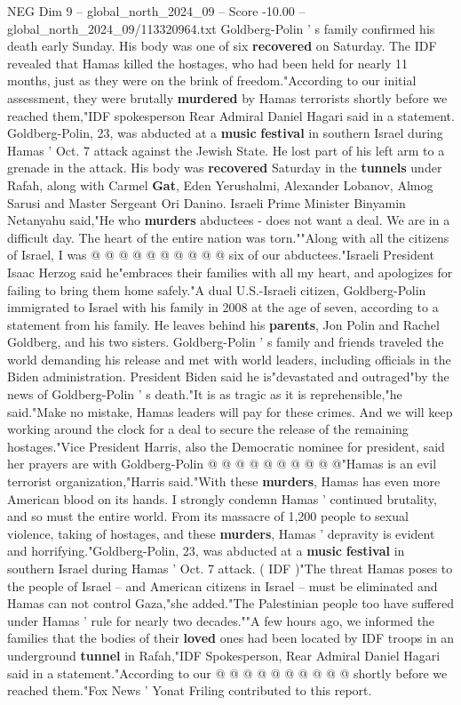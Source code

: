 \begin{textsample}{NEG Dim 9 – global\_north\_2024\_09 – Score -10.00 – global\_north\_2024\_09/113320964.txt}  \label{ex:f9_neg_016}
Goldberg-Polin ' s family confirmed his death early Sunday.
His body was one of six \textbf{recovered} on Saturday.
The IDF revealed that Hamas killed the hostages, who had been held for nearly 11 months, just as they were on the brink of freedom."According to our initial assessment, they were brutally \textbf{murdered} by Hamas terrorists shortly before we reached them,"IDF spokesperson Rear Admiral Daniel Hagari said in a statement.
Goldberg-Polin, 23, was abducted at a \textbf{music} \textbf{festival} in southern Israel during Hamas ' Oct. 7 attack against the Jewish State.
He lost part of his left arm to a grenade in the attack.
His body was \textbf{recovered} Saturday in the \textbf{tunnels} under Rafah, along with Carmel \textbf{Gat}, Eden Yerushalmi, Alexander Lobanov, Almog Sarusi and Master Sergeant Ori Danino.
Israeli Prime Minister Binyamin Netanyahu said,"He who \textbf{murders} abductees - does not want a deal.
We are in a difficult day.
The heart of the entire nation was torn.""Along with all the citizens of Israel, I was @ @ @ @ @ @ @ @ @ @ six of our abductees."Israeli President Isaac Herzog said he"embraces their families with all my heart, and apologizes for failing to bring them home safely."A dual U.S.-Israeli citizen, Goldberg-Polin immigrated to Israel with his family in 2008 at the age of seven, according to a statement from his family.
He leaves behind his \textbf{parents}, Jon Polin and Rachel Goldberg, and his two sisters.
Goldberg-Polin ' s family and friends traveled the world demanding his release and met with world leaders, including officials in the Biden administration.
President Biden said he is"devastated and outraged"by the news of Goldberg-Polin ' s death."It is as tragic as it is reprehensible,"he said."Make no mistake, Hamas leaders will pay for these crimes.
And we will keep working around the clock for a deal to secure the release of the remaining hostages."Vice President Harris, also the Democratic nominee for president, said her prayers are with Goldberg-Polin @ @ @ @ @ @ @ @ @ @"Hamas is an evil terrorist organization,"Harris said."With these \textbf{murders}, Hamas has even more American blood on its hands.
I strongly condemn Hamas ' continued brutality, and so must the entire world.
From its massacre of 1,200 people to sexual violence, taking of hostages, and these \textbf{murders}, Hamas ' depravity is evident and horrifying."Goldberg-Polin, 23, was abducted at a \textbf{music} \textbf{festival} in southern Israel during Hamas ' Oct. 7 attack. ( IDF )"The threat Hamas poses to the people of Israel -- and American citizens in Israel -- must be eliminated and Hamas can not control Gaza,"she added."The Palestinian people too have suffered under Hamas ' rule for nearly two decades.""A few hours ago, we informed the families that the bodies of their \textbf{loved} ones had been located by IDF troops in an underground \textbf{tunnel} in Rafah,"IDF Spokesperson, Rear Admiral Daniel Hagari said in a statement."According to our @ @ @ @ @ @ @ @ @ @ shortly before we reached them."Fox News ' Yonat Friling contributed to this report.

\end{textsample}
